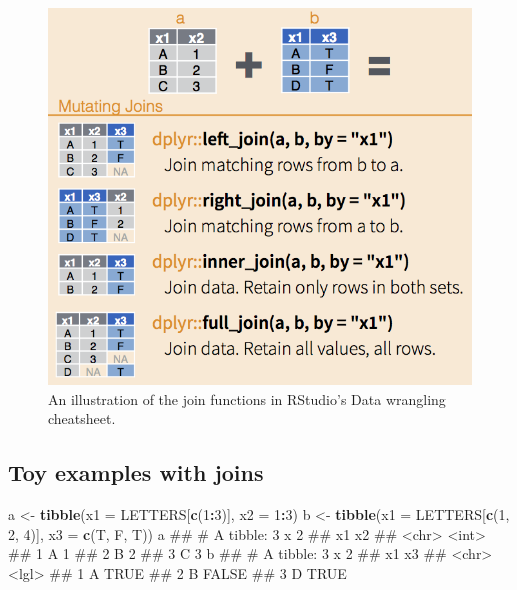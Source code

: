 \documentclass[]{book}
\newenvironment{Shaded}{\begin{snugshade}}{\end{snugshade}}
\newcommand{\KeywordTok}[1]{\textcolor[rgb]{0.13,0.29,0.53}{\textbf{#1}}}
\newcommand{\DataTypeTok}[1]{\textcolor[rgb]{0.13,0.29,0.53}{#1}}
\newcommand{\DecValTok}[1]{\textcolor[rgb]{0.00,0.00,0.81}{#1}}
\newcommand{\StringTok}[1]{\textcolor[rgb]{0.31,0.60,0.02}{#1}}
\newcommand{\OperatorTok}[1]{\textcolor[rgb]{0.81,0.36,0.00}{\textbf{#1}}}
\newcommand{\NormalTok}[1]{#1}
\begin{document}
\begin{figure}

{\centering \includegraphics[width=0.75\linewidth]{figures/dplyr-joins} 

}

\caption{An illustration of the join functions in RStudio’s Data wrangling cheatsheet.}\label{fig:join}
\end{figure}

\subsection{Toy examples with joins}\label{toy-examples-with-joins}

\begin{Shaded}
\begin{Highlighting}[]
\NormalTok{a <-}\StringTok{ }\KeywordTok{tibble}\NormalTok{(}\DataTypeTok{x1 =}\NormalTok{ LETTERS[}\KeywordTok{c}\NormalTok{(}\DecValTok{1}\OperatorTok{:}\DecValTok{3}\NormalTok{)], }
                \DataTypeTok{x2 =} \DecValTok{1}\OperatorTok{:}\DecValTok{3}\NormalTok{)}
\NormalTok{b <-}\StringTok{ }\KeywordTok{tibble}\NormalTok{(}\DataTypeTok{x1 =}\NormalTok{ LETTERS[}\KeywordTok{c}\NormalTok{(}\DecValTok{1}\NormalTok{, }\DecValTok{2}\NormalTok{, }\DecValTok{4}\NormalTok{)], }
                \DataTypeTok{x3 =} \KeywordTok{c}\NormalTok{(T, F, T))}
\NormalTok{a}
\NormalTok{## # A tibble: 3 x 2}
\NormalTok{##   x1       x2}
\NormalTok{##   <chr> <int>}
\NormalTok{## 1 A         1}
\NormalTok{## 2 B         2}
\NormalTok{## 3 C         3}
\NormalTok{b}
\NormalTok{## # A tibble: 3 x 2}
\NormalTok{##   x1    x3   }
\NormalTok{##   <chr> <lgl>}
\NormalTok{## 1 A     TRUE }
\NormalTok{## 2 B     FALSE}
\NormalTok{## 3 D     TRUE}
\end{Highlighting}
\end{Shaded}
\end{document}
